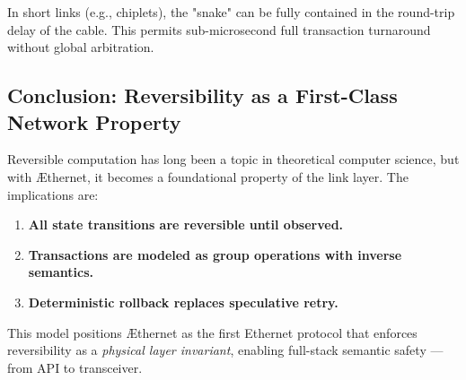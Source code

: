 In short links (e.g., chiplets), the "snake" can be fully contained in the round-trip delay of the cable. This permits sub-microsecond full transaction turnaround without global arbitration.

\subsection*{Conclusion: Reversibility as a First-Class Network Property}

Reversible computation has long been a topic in theoretical computer science, but with \AE thernet, it becomes a foundational property of the link layer. The implications are:

\begin{enumerate}
  \item \textbf{All state transitions are reversible until observed.}
  \item \textbf{Transactions are modeled as group operations with inverse semantics.}
  \item \textbf{Deterministic rollback replaces speculative retry.}
\end{enumerate}

This model positions \AE thernet as the first Ethernet protocol that enforces reversibility as a \emph{physical layer invariant}, enabling full-stack semantic safety — from API to transceiver.



